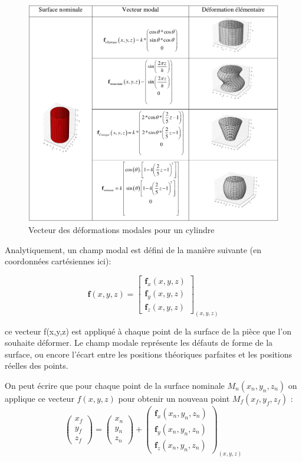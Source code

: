 \documentclass[a4paper,10pt]{article}
\begin{document}
\begin{figure}[H]
   \centering   
   \includegraphics[scale=0.3]{VecteurModalCylindre.png}
      \caption{Vecteur des déformations modales pour un cylindre}
         \label{VecteurModalCylindre}
\end{figure}

Analytiquement, un champ modal est défini de la manière suivante (en coordonnées cartésiennes ici):

\begin{equation}
\textbf{f}(x,y,z) = 
\begin{bmatrix}
\textbf{f}_{x}(x,y,z) \\
\textbf{f}_{y}(x,y,z) \\
\textbf{f}_{z}(x,y,z)
\end{bmatrix}_{(x,y,z)}
\end{equation} 

ce vecteur f(x,y,z) est appliqué à chaque point de la surface de la pièce que l'on souhaite déformer. Le champ modale représente les défauts de forme de la surface, ou encore l'écart entre les positions théoriques parfaites et les positions réelles des points. 

On peut écrire que pour chaque point de la surface nominale $ M_{n}(x_{n}, y_{n}, z_{n}) $ on applique ce vecteur $ f(x,y,z) $ pour obtenir un nouveau point $ M_{f}(x_{f}, y_{f}, z_{f}) $ :
\begin{equation}
\begin{pmatrix}
x_{f} \\
y_{f} \\
z_{f} 
\end{pmatrix} = 
\begin{pmatrix}
x_{n} \\
y_{n} \\
z_{n} 
\end{pmatrix} +
\begin{pmatrix}
\textbf{f}_{x}(x_{n},y_{n},z_{n}) \\
\textbf{f}_{y}(x_{n},y_{n},z_{n}) \\
\textbf{f}_{z}(x_{n},y_{n},z_{n})
\end{pmatrix}_{(x,y,z)}
\end{equation}
\end{document}
